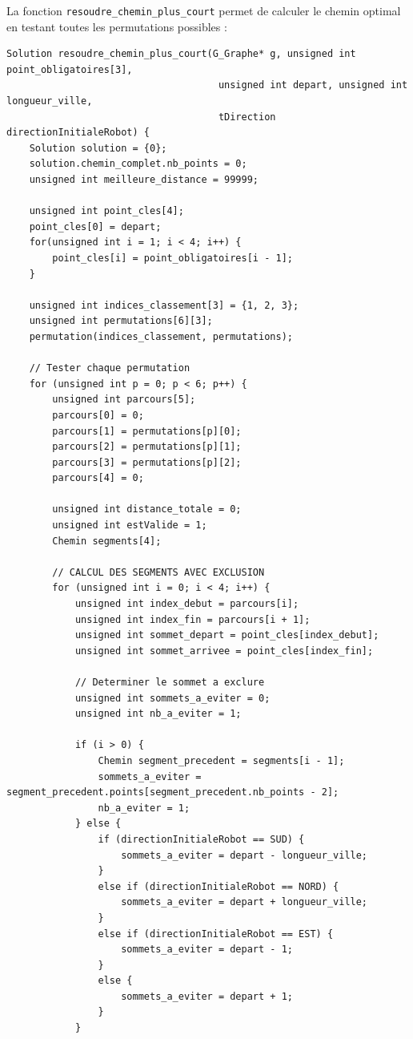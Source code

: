 \documentclass[11pt,a4paper]{article}
\begin{document}
La fonction \texttt{resoudre\_chemin\_plus\_court} permet de calculer le chemin optimal en testant toutes les permutations possibles :

\begin{lstlisting}[caption={Fonction de résolution du chemin optimal}, label=lst:resoudre]
Solution resoudre_chemin_plus_court(G_Graphe* g, unsigned int point_obligatoires[3], 
                                     unsigned int depart, unsigned int longueur_ville, 
                                     tDirection directionInitialeRobot) {
    Solution solution = {0};
    solution.chemin_complet.nb_points = 0;
    unsigned int meilleure_distance = 99999;

    unsigned int point_cles[4];
    point_cles[0] = depart;
    for(unsigned int i = 1; i < 4; i++) {
        point_cles[i] = point_obligatoires[i - 1];
    }

    unsigned int indices_classement[3] = {1, 2, 3};
    unsigned int permutations[6][3];
    permutation(indices_classement, permutations);

    // Tester chaque permutation
    for (unsigned int p = 0; p < 6; p++) {        
        unsigned int parcours[5];
        parcours[0] = 0;
        parcours[1] = permutations[p][0];
        parcours[2] = permutations[p][1];
        parcours[3] = permutations[p][2];
        parcours[4] = 0;

        unsigned int distance_totale = 0;
        unsigned int estValide = 1;
        Chemin segments[4];

        // CALCUL DES SEGMENTS AVEC EXCLUSION
        for (unsigned int i = 0; i < 4; i++) {
            unsigned int index_debut = parcours[i];
            unsigned int index_fin = parcours[i + 1];
            unsigned int sommet_depart = point_cles[index_debut];
            unsigned int sommet_arrivee = point_cles[index_fin];

            // Determiner le sommet a exclure
            unsigned int sommets_a_eviter = 0;
            unsigned int nb_a_eviter = 1;

            if (i > 0) {
                Chemin segment_precedent = segments[i - 1];
                sommets_a_eviter = segment_precedent.points[segment_precedent.nb_points - 2];
                nb_a_eviter = 1;
            } else {
                if (directionInitialeRobot == SUD) {
                    sommets_a_eviter = depart - longueur_ville;
                }
                else if (directionInitialeRobot == NORD) {
                    sommets_a_eviter = depart + longueur_ville;
                }
                else if (directionInitialeRobot == EST) {
                    sommets_a_eviter = depart - 1;
                }
                else {
                    sommets_a_eviter = depart + 1;
                }
            }


\end{lstlisting}
\end{document}
